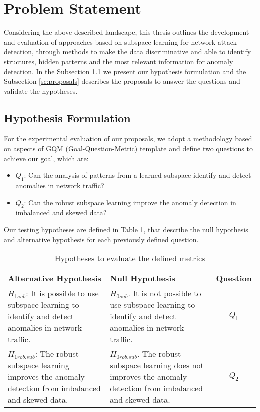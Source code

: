 \section{Problem Statement}
\label{sc:problems}

Considering the above described landscape, this thesis outlines the development and evaluation of approaches based on subspace learning for network attack detection, through methods to make the data discriminative and able to identify structures, hidden patterns and the most relevant information for anomaly detection. In the Subsection \ref{sc:Hypothesis} we present our hypothesis formulation and the Subsection \ref{sc:proposals} describes the proposals to answer the questions and validate the hypotheses.

\subsection{Hypothesis Formulation}
\label{sc:Hypothesis}

For the experimental evaluation of our proposals, we adopt a methodology based on aspects of GQM (Goal-Question-Metric) template \citep{Basili1994} and define two questions to achieve our goal, which are:

\begin{itemize}
	\item $Q_1$: Can the analysis of patterns from a learned subspace identify and detect anomalies in network traffic?
	\item $Q_2$: Can the robust subspace learning improve the anomaly detection in imbalanced and skewed data?
\end{itemize}

Our testing hypotheses are defined in Table \ref{tab:hypothesis}, that describe the null hypothesis and alternative hypothesis for each previously defined question. 

\begin{table}[htb]
	\centering
	\caption{Hypotheses to evaluate the defined metrics}
	\label{tab:hypothesis}
    \begin{tabular}{|p{6cm}|p{6cm}|c|} \hline
        \textbf{Alternative Hypothesis}	&\textbf{Null Hypothesis}	&\textbf{Question} 	\\ \hline
        $H_{1sub}$: It is possible to use subspace learning to identify and detect anomalies in network traffic.
        &$H_{0sub}$. It is not possible to use subspace learning to identify and detect anomalies in network traffic.	&$Q_1$\\ \hline
        $H_{1rob.sub}$: The robust subspace learning improves the anomaly detection from imbalanced and skewed data.	&$H_{0rob.sub}$. The robust subspace learning does not improves the anomaly detection from imbalanced and skewed data.	&$Q_2$\\ \hline
    \end{tabular}
\end{table}

